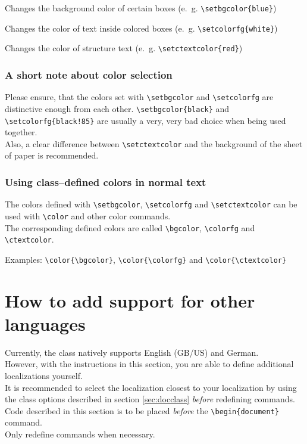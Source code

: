 \documentclass[11pt]{ltxdoc}
\begin{document}
	\medskip
	\DescribeMacro{\setbgcolor}
	Changes the background color of certain boxes (e.~g. \verb|\setbgcolor{blue}|)
	
	\medskip
	\DescribeMacro{\setcolorfg}
	Changes the color of text inside colored boxes (e.~g. \verb|\setcolorfg{white}|)
	
	\medskip
	\DescribeMacro{\setctextcolor}
	Changes the color of structure text (e.~g. \verb|\setctextcolor{red}|)
	
	
	\subsubsection{A short note about color selection}
	Please ensure, that the colors set with \verb|\setbgcolor| and \verb|\setcolorfg| are distinctive enough from each other. \verb|\setbgcolor{black}| and \verb|\setcolorfg{black!85}| are usually a very, very bad choice when being used together. \\
	Also, a clear difference between \verb|\setctextcolor| and the background of the sheet of paper is recommended.
	
	
	\subsubsection{Using class--defined colors in normal text}
	The colors defined with \verb|\setbgcolor|, \verb|\setcolorfg| and \verb|\setctextcolor| can be used with \verb|\color| and other color commands. \\
	The corresponding defined colors are called \verb|\bgcolor|, \verb|\colorfg| and \verb|\ctextcolor|.
	
	\medskip
	Examples: \verb|\color{\bgcolor}|, \verb|\color{\colorfg}| and \verb|\color{\ctextcolor}|
	
	
	
	\section{How to add support for other languages}
	Currently, the class natively supports English (GB/US) and German. \\
	However, with the instructions in this section, you are able to define additional localizations yourself. \\
	It is recommended to select the localization closest to your localization by using the class options described in section \ref{sec:docclass} \textit{before} redefining commands. \\
	Code described in this section is to be placed \textit{before} the \verb|\begin{document}| command. \\
	Only redefine commands when necessary.
	
\end{document}
